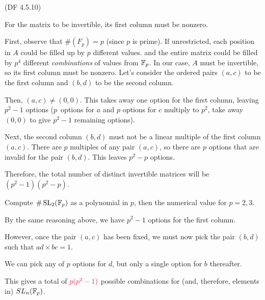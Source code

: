 \begin{problem}{(\textsf{DF 4.5.10})}
\begin{enumalph}
\begin{Answer}
        \noindent
        For the matrix to be invertible, its first column must be nonzero.
        
        First, observe that $\#(F_p) = p$ (since $p$ is prime).
        If unrestricted, each position in $A$ could be filled up by $p$ different values.
        and the entire matrix could be filled by $p^4$ different \textit{combinations} of values
        from $\mathbb{F}_p$.
        In our case, $A$ must be invertible, so its first column must be nonzero.
        Let's consider the ordered pairs $(a,c)$ to be the first column
        and $(b,d)$ to be the second column.
        
        Then, $(a, c) \neq (0,0)$. This takes away one option for the first column,
        leaving $p^2 - 1$ options ($p$~options for $a$ and $p$ options for $c$
        multiply to $p^2$, take away $(0,0)$ to give $p^2 - 1$ remaining options).
        
        Next, the second column $(b,d)$ must not be a linear multiple of the first column $(a,c)$.
        There are $p$ multiples of any pair $(a,c)$, so there are $p$ options that are invalid
        for the pair $(b,d)$. This leaves $p^2 - p$ options.

        Therefore, the total number of distinct invertible matrices will be
        $(p^2 - 1)(p^2 - p)$.
      \end{Answer}
    \item Compute $\#\operatorname{SL}_2(\mathbb{F}_p)$ as a polynomial in $p$,
      then the numerical value for $p=2,3$.

      \begin{Answer}
        By the same reasoning above, we have $p^2 - 1$ options for the first column.

        However, once the pair $(a, c)$ has been fixed, we must now pick
        the pair $(b, d)$ such that $ad \times bc = 1$.

        \noindent
        We can pick any of $p$ options for $d$, but only a single option for $b$ thereafter.

        This gives a total of $\crim{p(p^2 - 1)}$ possible combinations for (and, therefore,
        elements in) $SL_n(\mathbb{F}_p)$.


\end{Answer}
\end{enumalph}
\end{problem}

